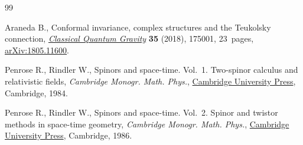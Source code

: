 \begin{thebibliography}{99}

Araneda B., Conformal invariance, complex structures and the {T}eukolsky
 connection, \href{https://doi.org/10.1088/1361-6382/aad13b}{\textit{Classical Quantum Gravity}} \textbf{35} (2018), 175001,
 23~pages, \href{https://arxiv.org/abs/1805.11600}{arXiv:1805.11600}.

Penrose R., Rindler W., Spinors and space-time. {V}ol.~1. {T}wo-spinor calculus
 and relativistic fields, \textit{Cambridge Monogr. Math. Phys.}, \href{https://doi.org/10.1017/CBO9780511564048}{Cambridge University
 Press}, Cambridge, 1984.

Penrose R., Rindler W., Spinors and space-time. {V}ol.~2. Spinor and twistor
 methods in space-time geometry, \textit{Cambridge Monogr. Math. Phys.}, \href{https://doi.org/10.1017/CBO9780511524486}{Cambridge
 University Press}, Cambridge, 1986.

\end{thebibliography}
